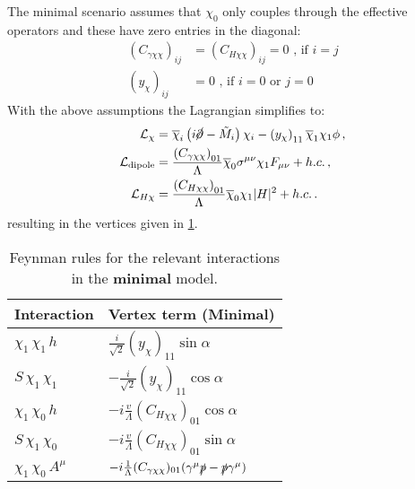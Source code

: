 \documentclass[a4paper,11pt]{article}
\begin{document}
The minimal scenario assumes that $\chi_0$ only couples through the effective operators and these have zero entries in the diagonal:
\begin{align}
	(C_{\gamma\chi\chi})_{ij} &= (C_{H\chi\chi})_{ij} = 0 \mbox{ , if $i = j$} \\
	(y_{\chi})_{ij} & = 0 \mbox{ , if $i = 0$ or $j = 0$ }
\end{align}
With the above assumptions the Lagrangian simplifies to:
\begin{align}
	\mathcal{L}_\chi &=  \overline{\chi}_i \left( i \cancel \partial -\tilde{M}_i\right) \chi_i - \left(y_\chi\right)_{11} \overline{\chi}_1 \chi_1 \phi \,, \\
	\mathcal{L}_{\rm dipole} &= \frac{\left(C_{\gamma \chi \chi}\right)_{01}}{\Lambda} \overline{\chi}_0 \sigma^{\mu\nu} \chi_1 F_{\mu\nu} + h.c. \,,\\
	\mathcal{L}_{H\chi} &= \frac{\left(C_{H \chi \chi}\right)_{01}}{\Lambda} \overline{\chi}_0 \chi_1 |H|^2 + h.c. \,.
\end{align}
resulting in the vertices given in \cref{tab:feynmanRules2}.

\begin{table}[h!]   \centering
	\vspace{0.2cm}
	\caption{Feynman rules for the relevant interactions in the {\bf minimal} model. \label{tab:feynmanRules2}}
	\begin{tabular}{p{2cm}|p{4.5cm}}
		\toprule
		\textbf{Interaction} & \textbf{Vertex term (Minimal)}\\ \toprule 
		$ \chi_1\,\chi_1\,h$ & $\frac{i}{\sqrt{2}} (y_{\chi})_{11} \sin\alpha$\\
		$S\,\chi_1\,\chi_1$  & $-\frac{i}{\sqrt{2}} (y_{\chi})_{11} \cos\alpha $\\
		$\chi_1\,\chi_0\,h$  & $-i \frac{v}{\Lambda} (C_{H\chi\chi})_{01} \cos\alpha$\\
		$S\,\chi_1\,\chi_0$ &  $-i \frac{v}{\Lambda} (C_{H\chi\chi})_{01} \sin\alpha$\\
		$\chi_1\,\chi_0\, A^\mu$  & $-i \frac{1}{\Lambda} (C_{\gamma\chi\chi})_{01} (\gamma^\mu \slashed{p} - \slashed{p} \gamma^\mu)$\\
		\bottomrule        
	\end{tabular}
\end{table}

%
%
\end{document}
